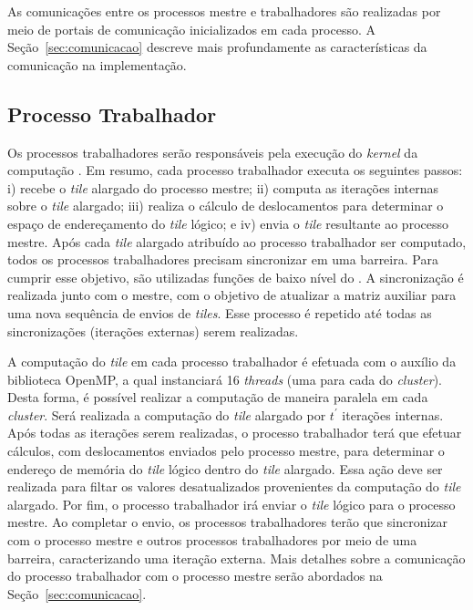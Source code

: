 As comunicações entre os processos mestre e trabalhadores são realizadas por
meio de portais de comunicação inicializados em cada processo. A
Seção~\ref{sec:comunicacao} descreve mais profundamente as características da
comunicação na implementação.






\subsection{Processo Trabalhador}
Os processos trabalhadores serão responsáveis pela
execução do \textit{kernel} da computação \stencil. Em resumo, cada processo
trabalhador executa os seguintes passos: i) recebe o \textit{tile} alargado do processo mestre;
ii) computa as iterações internas sobre o \textit{tile} alargado; iii) realiza o
cálculo de deslocamentos para determinar o espaço de endereçamento do
\textit{tile} lógico; e iv) envia o \textit{tile} resultante ao processo mestre. Após cada \textit{tile}
alargado atribuído ao processo trabalhador ser computado, todos os processos
trabalhadores precisam sincronizar em uma barreira. Para cumprir esse objetivo,
são utilizadas funções de baixo nível do \mppa. A sincronização é realizada
junto com o mestre, com o objetivo de atualizar a matriz auxiliar para uma nova
sequência de envios de \textit{tiles}. Esse processo é repetido até
todas as sincronizações (iterações externas) serem realizadas.

A computação do \textit{tile} em cada processo trabalhador é efetuada com o auxílio da biblioteca
OpenMP, a qual instanciará 16 \textit{threads} (uma para cada \pe do \textit{cluster}).
Desta forma, é possível realizar a computação de maneira paralela em
cada \textit{cluster}. Será realizada a computação do \textit{tile} alargado por
$t^\prime$ iterações internas. Após todas as iterações serem realizadas, o
processo trabalhador terá que efetuar cálculos, com deslocamentos enviados
pelo processo mestre, para determinar o endereço de memória do \textit{tile}
lógico dentro do \textit{tile} alargado. Essa ação deve ser realizada para
filtar os valores desatualizados provenientes da computação do \textit{tile}
alargado. Por fim, o processo trabalhador irá enviar o \textit{tile} lógico para o
processo mestre. Ao completar o envio, os processos trabalhadores terão que
sincronizar com o processo mestre e outros processos trabalhadores por meio de
uma barreira, caracterizando uma iteração externa. Mais detalhes sobre a
comunicação do processo trabalhador com o processo mestre serão abordados na
Seção~\ref{sec:comunicacao}.

